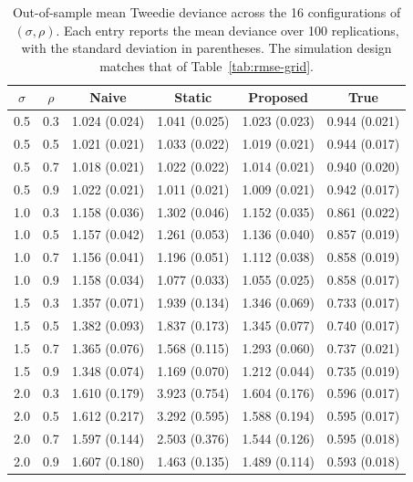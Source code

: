 \documentclass{sfuthesis}
\numberwithin{equation}{chapter}
\begin{document}
\begin{table}[htbp]
\centering
\caption{Out-of-sample mean Tweedie deviance across the 16 configurations of $(\sigma,\rho)$. Each entry reports the mean deviance over 100 replications, with the standard deviation in parentheses. The simulation design matches that of Table~\ref{tab:rmse-grid}.}
\label{tab:dev-grid}
\begin{tabular}{cccccc}
\hline
$\sigma$ & $\rho$ & Naive & Static & Proposed & True \\
\hline
0.5 & 0.3 & 1.024 (0.024) & 1.041 (0.025) & 1.023 (0.023) & 0.944 (0.021) \\
0.5 & 0.5 & 1.021 (0.021) & 1.033 (0.022) & 1.019 (0.021) & 0.944 (0.017) \\
0.5 & 0.7 & 1.018 (0.021) & 1.022 (0.022) & 1.014 (0.021) & 0.940 (0.020) \\
0.5 & 0.9 & 1.022 (0.021) & 1.011 (0.021) & 1.009 (0.021) & 0.942 (0.017) \\
1.0 & 0.3 & 1.158 (0.036) & 1.302 (0.046) & 1.152 (0.035) & 0.861 (0.022) \\
1.0 & 0.5 & 1.157 (0.042) & 1.261 (0.053) & 1.136 (0.040) & 0.857 (0.019) \\
1.0 & 0.7 & 1.156 (0.041) & 1.196 (0.051) & 1.112 (0.038) & 0.858 (0.019) \\
1.0 & 0.9 & 1.158 (0.034) & 1.077 (0.033) & 1.055 (0.025) & 0.858 (0.017) \\
1.5 & 0.3 & 1.357 (0.071) & 1.939 (0.134) & 1.346 (0.069) & 0.733 (0.017) \\
1.5 & 0.5 & 1.382 (0.093) & 1.837 (0.173) & 1.345 (0.077) & 0.740 (0.017) \\
1.5 & 0.7 & 1.365 (0.076) & 1.568 (0.115) & 1.293 (0.060) & 0.737 (0.021) \\
1.5 & 0.9 & 1.348 (0.074) & 1.169 (0.070) & 1.212 (0.044) & 0.735 (0.019) \\
2.0 & 0.3 & 1.610 (0.179) & 3.923 (0.754) & 1.604 (0.176) & 0.596 (0.017) \\
2.0 & 0.5 & 1.612 (0.217) & 3.292 (0.595) & 1.588 (0.194) & 0.595 (0.017) \\
2.0 & 0.7 & 1.597 (0.144) & 2.503 (0.376) & 1.544 (0.126) & 0.595 (0.018) \\
2.0 & 0.9 & 1.607 (0.180) & 1.463 (0.135) & 1.489 (0.114) & 0.593 (0.018) \\
\hline
\end{tabular}
\end{table}
\end{document}
